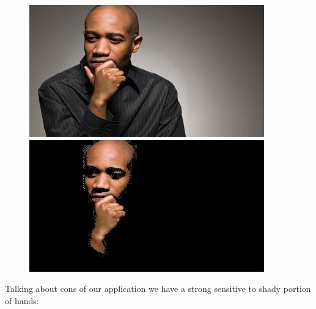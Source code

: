 \begin{center}
    \begin{figure}[!htb]
        \begin{minipage}{0.5\textwidth}
            \centering
            \includegraphics[scale=0.7]{images/unused_seg/30.jpg}
        \end{minipage}
        \begin{minipage}{0.5\textwidth}
            \centering
            \includegraphics[scale=0.7]{images/unused_seg/30m.jpg} 
        \end{minipage}
    \end{figure}
\end{center}
\pagebreak
Talking about cons of our application we have a strong sensitive to shady portion of hands: 

